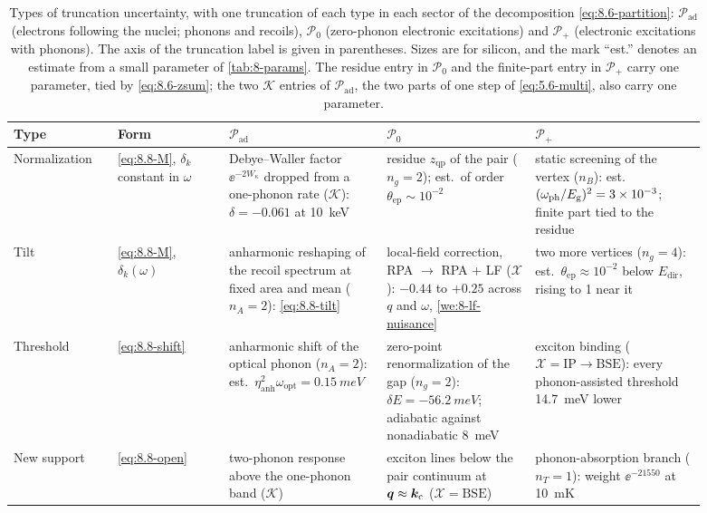 \begin{table}[tbp]
  \caption{Types of truncation uncertainty, with one truncation of each type in each sector of the decomposition \cref{eq:8.6-partition}: $\mathcal{P}_{\mathrm{ad}}$ (electrons following the nuclei; phonons and recoils), $\mathcal{P}_0$ (zero-phonon electronic excitations) and $\mathcal{P}_+$ (electronic excitations with phonons). The axis of the truncation label is given in parentheses. Sizes are for silicon, and the mark ``est.'' denotes an estimate from a small parameter of \cref{tab:8-params}. The residue entry in $\mathcal{P}_0$ and the finite-part entry in $\mathcal{P}_+$ carry one parameter, tied by \cref{eq:8.6-zsum}; the two $\mathcal{K}$ entries of $\mathcal{P}_{\mathrm{ad}}$, the two parts of one step of \cref{eq:5.6-multi}, also carry one parameter.}
  \label{tab:8-nuisances}
  \centering\small\setlength{\tabcolsep}{4pt}
  \begin{tabular}{@{}>{\raggedright\arraybackslash}p{0.14\linewidth}>{\raggedright\arraybackslash}p{0.15\linewidth}>{\raggedright\arraybackslash}p{0.20\linewidth}>{\raggedright\arraybackslash}p{0.20\linewidth}>{\raggedright\arraybackslash}p{0.20\linewidth}@{}}
    \toprule
    Type & Form & $\mathcal{P}_{\mathrm{ad}}$ & $\mathcal{P}_0$ & $\mathcal{P}_+$ \\
    \midrule
    Normali\-zation & \cref{eq:8.8-M}, $\delta_k$ constant in $\omega$ & Debye--Waller factor $\ee^{-2W_\kappa}$ dropped from a one-phonon rate ($\mathcal{K}$): $\delta = -0.061$ at \SI{10}{keV} & residue $z_{\mathrm{qp}}$ of the pair ($n_g = 2$); est.\ of order $\theta_{\mathrm{ep}} \sim 10^{-2}$ & static screening of the vertex ($n_B$): est.\ $(\omega_{\mathrm{ph}}/E_{\mathrm{g}})^2 = 3\times10^{-3}$; finite part tied to the residue \\
    Tilt & \cref{eq:8.8-M}, $\delta_k(\omega)$ & anharmonic reshaping of the recoil spectrum at fixed area and mean ($n_A = 2$): \cref{eq:8.8-tilt} & local-field correction, RPA $\to$ RPA + LF ($\mathcal{X}$): $-0.44$ to $+0.25$ across $q$ and $\omega$, \cref{we:8-lf-nuisance} & two more vertices ($n_g = 4$): est.\ $\theta_{\mathrm{ep}} \approx 10^{-2}$ below $E_{\mathrm{dir}}$, rising to 1 near it \\
    Threshold & \cref{eq:8.8-shift} & anharmonic shift of the optical phonon ($n_A = 2$): est.\ $\eta_{\mathrm{anh}}^2\omega_{\mathrm{opt}} = \SI{0.15}{meV}$ & zero-point renormalization of the gap ($n_g = 2$): $\delta E = \SI{-56.2}{meV}$; adiabatic against nonadiabatic \SI{8}{meV} & exciton binding ($\mathcal{X} = \mathrm{IP} \to \mathrm{BSE}$): every phonon-assisted threshold \SI{14.7}{meV} lower \\
    New support & \cref{eq:8.8-open} & two-phonon response above the one-phonon band ($\mathcal{K}$) & exciton lines below the pair continuum at $\bm{q} \approx \bm{k}_{\mathrm{c}}$ ($\mathcal{X} = \mathrm{BSE}$) & phonon-absorption branch ($n_T = 1$): weight $\ee^{-21550}$ at \SI{10}{mK} \\
    \bottomrule
  \end{tabular}
\end{table}

